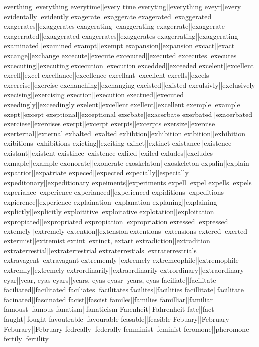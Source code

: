everthing||everything
everytime||every time
everyting||everything
eveyr||every
evidentally||evidently
exagerate||exaggerate
exagerated||exaggerated
exagerates||exaggerates
exagerating||exaggerating
exagerrate||exaggerate
exagerrated||exaggerated
exagerrates||exaggerates
exagerrating||exaggerating
examinated||examined
exampt||exempt
exapansion||expansion
excact||exact
excange||exchange
excecute||execute
excecuted||executed
excecutes||executes
excecuting||executing
excecution||execution
excedded||exceeded
excelent||excellent
excell||excel
excellance||excellence
excellant||excellent
excells||excels
excercise||exercise
exchanching||exchanging
excisted||existed
exculsivly||exclusively
execising||exercising
exection||execution
exectued||executed
exeedingly||exceedingly
exelent||excellent
exellent||excellent
exemple||example
exept||except
exeptional||exceptional
exerbate||exacerbate
exerbated||exacerbated
exerciese||exercises
exerpt||excerpt
exerpts||excerpts
exersize||exercise
exerternal||external
exhalted||exalted
exhibtion||exhibition
exibition||exhibition
exibitions||exhibitions
exicting||exciting
exinct||extinct
existance||existence
existant||existent
existince||existence
exliled||exiled
exludes||excludes
exmaple||example
exonorate||exonerate
exoskelaton||exoskeleton
expalin||explain
expatriot||expatriate
expeced||expected
expecially||especially
expeditonary||expeditionary
expeiments||experiments
expell||expel
expells||expels
experiance||experience
experianced||experienced
expiditions||expeditions
expierence||experience
explaination||explanation
explaning||explaining
explictly||explicitly
exploititive||exploitative
explotation||exploitation
expropiated||expropriated
expropiation||expropriation
exressed||expressed
extemely||extremely
extention||extension
extentions||extensions
extered||exerted
extermist||extremist
extint||extinct, extant
extradiction||extradition
extraterrestial||extraterrestrial
extraterrestials||extraterrestrials
extravagent||extravagant
extrememly||extremely
extremeophile||extremophile
extremly||extremely
extrordinarily||extraordinarily
extrordinary||extraordinary
eyar||year, eyas
eyars||years, eyas
eyasr||years, eyas
faciliate||facilitate
faciliated||facilitated
faciliates||facilitates
facilites||facilities
facillitate||facilitate
facinated||fascinated
facist||fascist
familes||families
familliar||familiar
famoust||famous
fanatism||fanaticism
Farenheit||Fahrenheit
fatc||fact
faught||fought
favoutrable||favourable
feasable||feasible
Febuary||February
Feburary||February
fedreally||federally
femminist||feminist
feromone||pheromone
fertily||fertility
